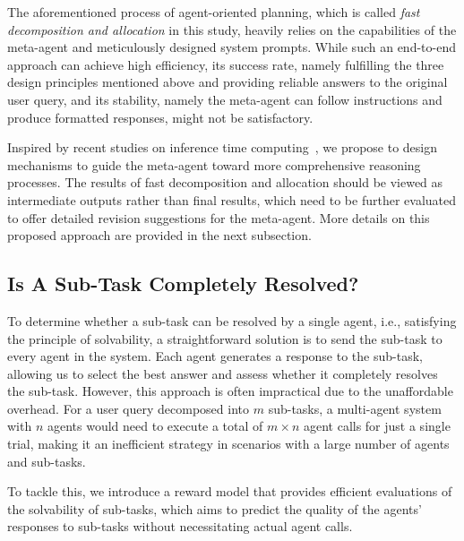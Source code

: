 The aforementioned process of agent-oriented planning, which is called {\it fast decomposition and allocation} in this study, heavily relies on the capabilities of the meta-agent and meticulously designed system prompts. While such an end-to-end approach can achieve high efficiency, its success rate, namely fulfilling the three design principles mentioned above and providing reliable answers to the original user query, and its stability, namely the meta-agent can follow instructions and produce formatted responses, might not be satisfactory.

Inspired by recent studies on inference time computing~\citep {openai20244o}, we propose to design mechanisms to guide the meta-agent toward more comprehensive reasoning processes. The results of fast decomposition and allocation should be viewed as intermediate outputs rather than final results, which need to be further evaluated to offer detailed revision suggestions for the meta-agent. 
More details on this proposed approach are provided in the next subsection.


\subsection{Is A Sub-Task Completely Resolved?}
\label{subsec:reward_model}
To determine whether a sub-task can be resolved by a single agent, i.e., satisfying the principle of solvability, a straightforward solution is to send the sub-task to every agent in the system. Each agent generates a response to the sub-task, allowing us to select the best answer and assess whether it completely resolves the sub-task.
However, this approach is often impractical due to the unaffordable overhead. For a user query decomposed into $m$ sub-tasks, a multi-agent system with $n$ agents would need to execute a total of $m\times n$ agent calls for just a single trial, making it an inefficient strategy in scenarios with a large number of agents and sub-tasks.

To tackle this, we introduce a reward model that provides efficient evaluations of the solvability of sub-tasks, which aims to predict the quality of the agents' responses to sub-tasks without necessitating actual agent calls.

